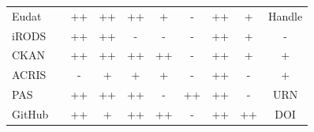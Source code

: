 \begin{table}
{\begin{tabular}{| l | c | c | c | c | c | c | c | c | c |}
            \cline{3-10}\cline{1-1}
            \cellcolor{first-column-blue}Eudat    && \cellcolor{green}++ & \cellcolor{green}++ & \cellcolor{green}++ & \cellcolor{yellow}+  & \cellcolor{red}-  &  \cellcolor{green}++ & \cellcolor{yellow}+  & \cellcolor{green}Handle \\
            \cline{3-10}\cline{1-1}
            \cellcolor{first-column-blue}iRODS    && \cellcolor{green}++ & \cellcolor{green}++ & \cellcolor{red}-  & \cellcolor{red}-  & \cellcolor{red}-  &  \cellcolor{green}++ & \cellcolor{yellow}+  & \cellcolor{red}- \\
            \cline{3-10}\cline{1-1}
            \cellcolor{first-column-blue}CKAN     && \cellcolor{green}++ & \cellcolor{green}++ & \cellcolor{green}++ & \cellcolor{green}++ & \cellcolor{red}-  &  \cellcolor{green}++ & \cellcolor{yellow}+  & \cellcolor{yellow}+ \\
            \cline{3-10}\cline{1-1}
            \cellcolor{first-column-blue}ACRIS    && \cellcolor{red}-  & \cellcolor{yellow}+  & \cellcolor{yellow}+  & \cellcolor{yellow}+  & \cellcolor{red}-  &  \cellcolor{green}++ & \cellcolor{red}-  & \cellcolor{yellow}+ \\
            \cline{3-10}\cline{1-1}
            \cellcolor{first-column-blue}PAS      && \cellcolor{green}++ & \cellcolor{green}++ & \cellcolor{green}++ & \cellcolor{red}-  & \cellcolor{green}++ &  \cellcolor{green}++ & \cellcolor{red}-  & \cellcolor{green}URN \\
            \cline{3-10}\cline{1-1}
            \cellcolor{first-column-blue}GitHub   && \cellcolor{green}++ & \cellcolor{yellow}+  & \cellcolor{green}++ & \cellcolor{green}++ & \cellcolor{red}-  &  \cellcolor{green}++ & \cellcolor{green}++ & \cellcolor{green}DOI \\
            \cline{3-10}\cline{1-1}
        \end{tabular}
    }
\end{table}

